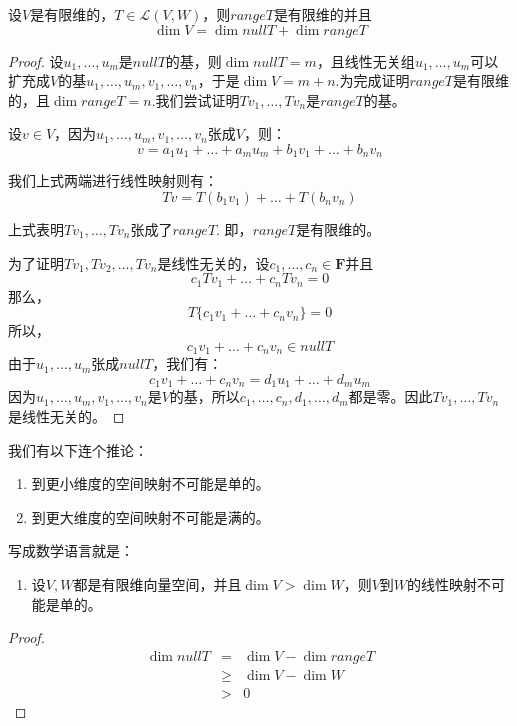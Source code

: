 \documentclass[10pt,a4paper,UTF8]{article}
\begin{document}
\begin{theorem}
设\(V\)是有限维的，\(T\in \mathcal{L}(V,W)\)，则\(rangeT\)是有限维的并且\[\dim V =\dim nullT + \dim rangeT\]
\end{theorem}
\begin{proof}
设\(u_{1},\ldots ,u_{m}\)是\(nullT\)的基，则\(\dim nullT = m\)，且线性无关组\(u_{1},\ldots ,u_{m}\)可以扩充成\(V\)的基\(u_{1},\ldots ,u_{m},v_{1},\ldots ,v_{n}\)，于是\(\dim V = m+n\).为完成证明\(rangeT\)是有限维的，且\(\dim rangeT = n\).我们尝试证明\(Tv_{1},\ldots ,Tv_{n}\)是\(rangeT\)的基。

设\(v\in V\)，因为\(u_{1},\ldots ,u_{m},v_{1},\ldots ,v_{n}\)张成\(V\)，则：\[v = a_{1}u_{1} + \ldots  + a_{m}u_{m} + b_{1}v_{1} + \ldots + b_{n}v_{n}\]

我们上式两端进行线性映射则有：
\[Tv = T(b_{1}v_{1}) + \ldots + T(b_{n}v_{n})\]

上式表明\(T{v_{1}},\ldots ,T{v_{n}}\)张成了\(rangeT\). 即，\(rangeT\)是有限维的。

为了证明\(T{v_{1}}, Tv_{2},\ldots ,Tv_{n}\)是线性无关的，设\(c_{1},\ldots ,c_{n}\in \mathbf{F}\)并且\[c_{1}Tv_{1} + \ldots + c_{n}Tv_{n} = 0\]
那么，\[T\{c_{1}v_{1} + \ldots + c_{n}v_{n}\} = 0\]
所以，\[c_{1}v_{1} + \ldots + c_{n}v_{n} \in nullT\] 由于\(u_{1},\ldots ,u_{m}\)张成\(nullT\)，我们有：
\[c_{1}v_{1} + \ldots + c_{n}v_{n} = d_{1}u_{1} + \ldots + d_{m}u_{m}\]
因为\(u_{1},\ldots ,u_{m},v_{1},\ldots ,v_{n}\)是\(V\)的基，所以\(c_{1},\ldots ,c_{n},d_{1},\ldots ,d_{m}\)都是零。因此\(Tv_{1},\ldots ,Tv_{n}\)是线性无关的。
\end{proof}

我们有以下连个推论：
\begin{enumerate}
\item 到更小维度的空间映射不可能是单的。
\item 到更大维度的空间映射不可能是满的。
\end{enumerate}

写成数学语言就是：
\begin{enumerate}
\item 设\(V,W\)都是有限维向量空间，并且\(\dim V > \dim W\)，则\(V\)到\(W\)的线性映射不可能是单的。
\end{enumerate}
\begin{proof}
\begin{eqnarray*}
\dim nullT &=& \dim V - \dim rangeT\\
& \geq & \dim V - \dim W \\
& > & 0
\end{eqnarray*}
\end{proof}
\end{document}

